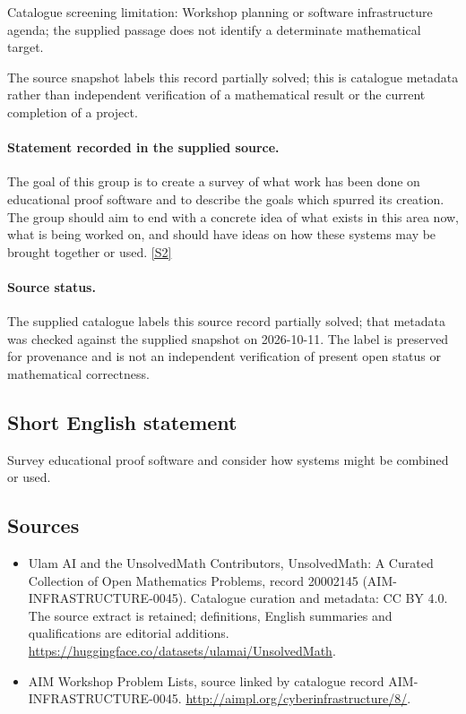\documentclass[11pt]{article}
\begin{document}
Catalogue screening limitation: Workshop planning or software infrastructure agenda; the supplied passage does not identify a determinate mathematical target.

The source snapshot labels this record partially solved; this is catalogue metadata rather than independent verification of a mathematical result or the current completion of a project.
\paragraph{Statement recorded in the supplied source.}
The goal of this group is to create a survey of what work has been done on educational proof software and to describe the goals which spurred its creation. The group should aim to end with a concrete idea of what exists in this area now, what is being worked on, and should have ideas on how these systems may be brought together or used. \href{http://aimpl.org/cyberinfrastructure/8/}{[S2]}
\paragraph{Source status.}
The supplied catalogue labels this source record partially solved; that metadata was checked against the supplied snapshot on 2026-10-11. The label is preserved for provenance and is not an independent verification of present open status or mathematical correctness.
\subsection{Short English statement}
Survey educational proof software and consider how systems might be combined or used.
\subsection{Sources}
\begin{itemize}
\item[S1] Ulam AI and the UnsolvedMath Contributors, UnsolvedMath: A Curated Collection of Open Mathematics Problems, record 20002145 (AIM-INFRASTRUCTURE-0045). Catalogue curation and metadata: CC BY 4.0. The source extract is retained; definitions, English summaries and qualifications are editorial additions.
\url{https://huggingface.co/datasets/ulamai/UnsolvedMath}.
\item[S2] AIM Workshop Problem Lists, source linked by catalogue record AIM-INFRASTRUCTURE-0045.
\url{http://aimpl.org/cyberinfrastructure/8/}.
\end{itemize}
\end{document}
